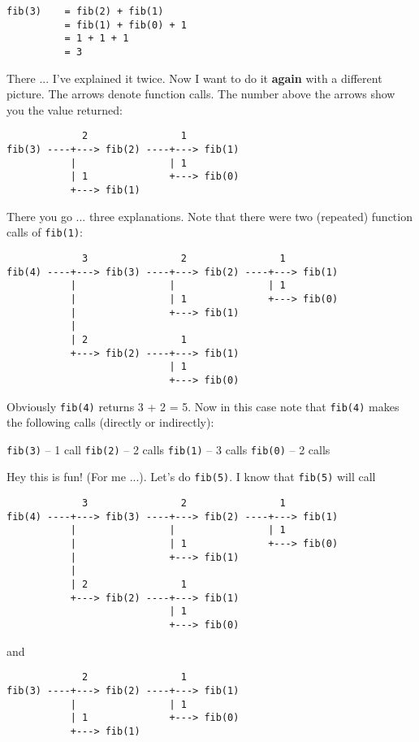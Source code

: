 \begin{Verbatim}
fib(3)    = fib(2) + fib(1)
          = fib(1) + fib(0) + 1
          = 1 + 1 + 1
          = 3
\end{Verbatim}
        
There ... I've explained it twice. Now I want to do it \textbf{again} with a different picture. The arrows denote
function calls. The number above the arrows show you the value returned:

\begin{Verbatim}
             2                1
fib(3) ----+---> fib(2) ----+---> fib(1)
           |                | 1
           | 1              +---> fib(0)
           +---> fib(1)
\end{Verbatim}
         
There you go ... three explanations. Note that there were two (repeated) function calls of \verb!fib(1)!:

\begin{Verbatim}
             3                2                1
fib(4) ----+---> fib(3) ----+---> fib(2) ----+---> fib(1)
           |                |                | 1
           |                | 1              +---> fib(0)
           |                +---> fib(1)
           |
           | 2                1
           +---> fib(2) ----+---> fib(1)
                            | 1
                            +---> fib(0)
\end{Verbatim}

Obviously \verb!fib(4)! returns 3 + 2 = 5. Now in this case note that \verb!fib(4)! makes the following calls
(directly or indirectly):

\begin{tightlist}
    \li \verb!fib(3)! -- 1 call
    \li \verb!fib(2)! -- 2 calls
    \li \verb!fib(1)! -- 3 calls
    \li \verb!fib(0)! -- 2 calls
\end{tightlist}



\newpage
Hey this is fun! (For me ...). Let's do \verb!fib(5)!. I know that
\verb!fib(5)! will call

\begin{Verbatim}
             3                2                1
fib(4) ----+---> fib(3) ----+---> fib(2) ----+---> fib(1)
           |                |                | 1
           |                | 1              +---> fib(0)
           |                +---> fib(1)
           |
           | 2                1
           +---> fib(2) ----+---> fib(1)
                            | 1
                            +---> fib(0)
\end{Verbatim}           
and
\begin{Verbatim}
             2                1
fib(3) ----+---> fib(2) ----+---> fib(1)
           |                | 1
           | 1              +---> fib(0)
           +---> fib(1)
\end{Verbatim}


